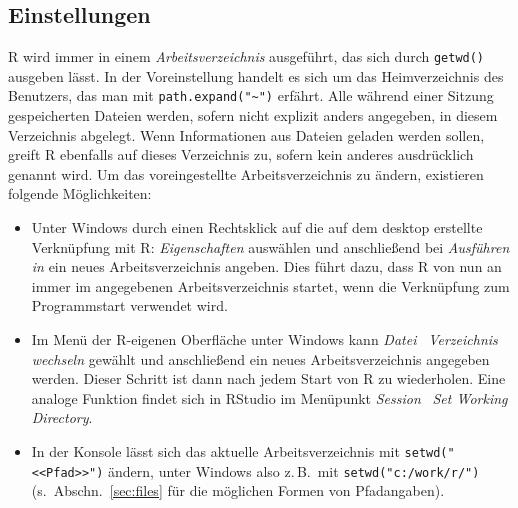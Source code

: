\subsection{Einstellungen}
\label{sec:settings}

R wird immer in einem \emph{Arbeitsverzeichnis} ausgeführt, das sich durch \lstinline!getwd()! ausgeben lässt. In der Voreinstellung handelt es sich um das Heimverzeichnis des Benutzers, das man mit \lstinline!path.expand("~")! erfährt. Alle während einer Sitzung gespeicherten Dateien werden, sofern nicht explizit anders angegeben, in diesem Verzeichnis abgelegt. Wenn Informationen aus Dateien geladen werden sollen, greift R ebenfalls auf dieses Verzeichnis zu, sofern kein anderes ausdrücklich genannt wird. Um das voreingestellte Arbeitsverzeichnis zu ändern, existieren folgende Möglichkeiten:

\begin{itemize}
\item Unter Windows durch einen Rechtsklick auf die auf dem desktop erstellte Verknüpfung mit R: \emph{Eigenschaften} auswählen und anschließend bei \emph{Ausführen in} ein neues Arbeitsverzeichnis angeben. Dies führt dazu, dass R von nun an immer im angegebenen Arbeitsverzeichnis startet, wenn die Verknüpfung zum Programmstart verwendet wird.
\item Im Menü der R-eigenen Oberfläche unter Windows kann \emph{Datei} \textrightarrow\ \emph{Verzeichnis wechseln} gewählt und anschließend ein neues Arbeitsverzeichnis angegeben werden. Dieser Schritt ist dann nach jedem Start von R zu wiederholen. Eine analoge Funktion findet sich in RStudio im Menüpunkt \emph{Session} \textrightarrow\ \emph{Set Working Directory}.
\item In der Konsole lässt sich das aktuelle Arbeitsverzeichnis mit \lstinline!setwd("<<Pfad>>")! ändern, unter Windows also z.\,B.\ mit \lstinline!setwd("c:/work/r/")! (s.\ Abschn.\ \ref{sec:files} für die möglichen Formen von Pfadangaben).
\end{itemize}

